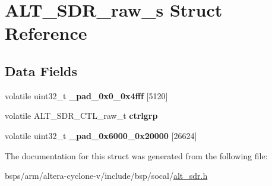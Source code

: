 \hypertarget{structALT__SDR__raw__s}{}\section{A\+L\+T\+\_\+\+S\+D\+R\+\_\+raw\+\_\+s Struct Reference}
\label{structALT__SDR__raw__s}
\subsection*{Data Fields}
\begin{DoxyCompactItemize}
\item 
\mbox{\label{structALT__SDR__raw__s_af7db8e493d9a8e6beb51af7801a18fe1}} 
volatile uint32\+\_\+t {\bfseries \+\_\+pad\+\_\+0x0\+\_\+0x4fff} \mbox{[}5120\mbox{]}
\item 
\mbox{\label{structALT__SDR__raw__s_ab3c5cfb760034f4535d00808ab4320be}} 
volatile A\+L\+T\+\_\+\+S\+D\+R\+\_\+\+C\+T\+L\+\_\+raw\+\_\+t {\bfseries ctrlgrp}
\item 
\mbox{\label{structALT__SDR__raw__s_a53e7c05d1bc31f24bc165bf6eeb224ec}} 
volatile uint32\+\_\+t {\bfseries \+\_\+pad\+\_\+0x6000\+\_\+0x20000} \mbox{[}26624\mbox{]}
\end{DoxyCompactItemize}


The documentation for this struct was generated from the following file\+:\begin{DoxyCompactItemize}
\item 
bsps/arm/altera-\/cyclone-\/v/include/bsp/socal/\mbox{\hyperlink{alt__sdr_8h}{alt\+\_\+sdr.\+h}}\end{DoxyCompactItemize}

